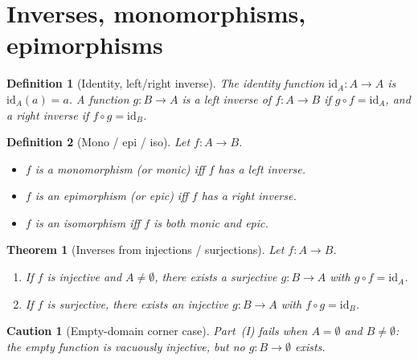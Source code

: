 \documentclass[11pt]{article}
\theoremstyle{defstyle}
\newtheorem{definition}{Definition}[section]
\theoremstyle{thmstyle}
\newtheorem{theorem}{Theorem}[section]
\theoremstyle{notstyle}
\theoremstyle{cautionstyle}
\newtheorem*{caution}{Caution}
\newcommand{\id}{\mathrm{id}}
\begin{document}
\section{Inverses, monomorphisms, epimorphisms}

\begin{defbox}
\begin{definition}[Identity, left/right inverse]
The \emph{identity function} $\id_A \colon A \to A$ is $\id_A(a) = a$.
A function $g \colon B \to A$ is a \emph{left inverse} of $f \colon A \to B$
if $g \circ f = \id_A$, and a \emph{right inverse} if $f \circ g = \id_B$.
\end{definition}
\end{defbox}

\begin{defbox}
\begin{definition}[Mono / epi / iso]
Let $f \colon A \to B$.
\begin{itemize}[leftmargin=2em, itemsep=2pt]
  \item $f$ is a \emph{monomorphism} (or \emph{monic}) iff $f$ has a left inverse.
  \item $f$ is an \emph{epimorphism} (or \emph{epic}) iff $f$ has a right inverse.
  \item $f$ is an \emph{isomorphism} iff $f$ is both monic and epic.
\end{itemize}
\end{definition}
\end{defbox}

\begin{thmbox}
\begin{theorem}[Inverses from injections / surjections]
Let $f \colon A \to B$.
\begin{enumerate}[label=\textnormal{(\Roman*)}, leftmargin=2.5em, itemsep=2pt]
  \item If $f$ is injective and $A \neq \emptyset$, there exists a
        \emph{surjective} $g \colon B \to A$ with $g \circ f = \id_A$.
  \item If $f$ is surjective, there exists an \emph{injective}
        $g \colon B \to A$ with $f \circ g = \id_B$.
\end{enumerate}
\end{theorem}
\end{thmbox}

\begin{cautionbox}
\begin{caution}[Empty-domain corner case]
Part~(I) fails when $A = \emptyset$ and $B \neq \emptyset$: the empty
function is vacuously injective, but no $g \colon B \to \emptyset$ exists.
\end{caution}
\end{cautionbox}
\end{document}
